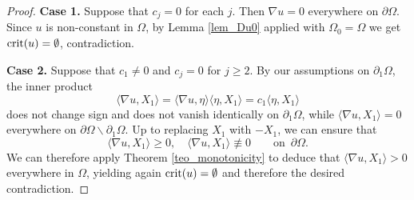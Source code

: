 \documentclass[10 pt,a4paper]{article}
\theoremstyle{definition}
\begin{document}
\begin{proof}
	\textbf{Case 1.} Suppose that $c_j = 0$ for each $j$. Then $\nabla u = 0$ everywhere on $\partial\Omega$. Since $u$ is non-constant in $\Omega$, by Lemma \ref{lem_Du0} applied with $\Omega_0 = \Omega$ we get ${\rm crit}(u)=\emptyset$, contradiction.
	
	
	\textbf{Case 2.} Suppose that $c_1\neq 0$ and $c_j=0$ for $j \ge 2$. By our assumptions on $\partial_1\Omega$, the inner product
	\[
		\langle\nabla u,X_1\rangle = \langle\nabla u,\eta\rangle \langle\eta,X_1\rangle = c_1 \langle\eta, X_1\rangle
	\]
	does not change sign and does not vanish identically on $\partial_1\Omega$, while $\langle\nabla u,X_1\rangle = 0$ everywhere on $\partial\Omega\backslash\partial_1\Omega$. Up to replacing $X_1$ with $-X_1$, we can ensure that
	\[
	\langle \nabla u, X_1 \rangle \ge 0, \quad \langle \nabla u,X_1 \rangle \not\equiv 0 \qquad \text{on } \, \partial \Omega. 
	\]
	We can therefore apply Theorem \ref{teo_monotonicity} to deduce that $\langle\nabla u,X_1\rangle > 0$ everywhere in $\Omega$, yielding again ${\rm crit}(u)=\emptyset$ and therefore the desired contradiction.
	 

\end{proof}
\end{document}
